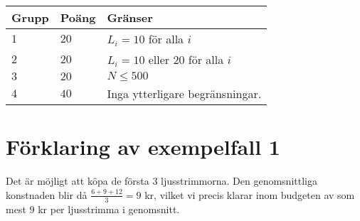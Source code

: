 \noindent
\begin{tabular}{| l | l | p{12cm} |}
  \hline
  \textbf{Grupp} & \textbf{Poäng} & \textbf{Gränser} \\ \hline
  $1$    & $20$       & $L_i=10$ för alla $i$ \\ \hline
  $2$    & $20$       & $L_i=10$ eller $20$ för alla $i$ \\ \hline
  $3$    & $20$       & $N \leq 500$ \\ \hline
  $4$    & $40$       & Inga ytterligare begränsningar. \\ \hline
\end{tabular}

\section*{Förklaring av exempelfall 1}
Det är möjligt att köpa de första 3 ljusstrimmorna.
Den genomsnittliga konstnaden blir då $\frac{6+9+12}{3}=9$ kr, vilket vi precis klarar inom budgeten av som mest $9$ kr per ljusstrimma i genomsnitt.
